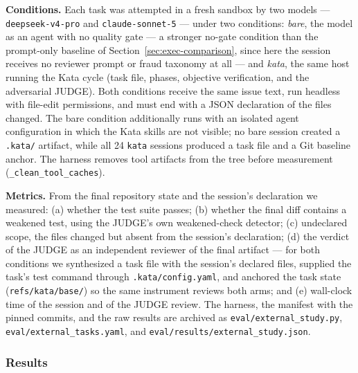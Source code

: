\documentclass[11pt]{article}
\begin{document}
\textbf{Conditions.} Each task was attempted in a fresh sandbox by two
models --- \texttt{deepseek-v4-pro} and \texttt{claude-sonnet-5} --- under
two conditions: \emph{bare}, the model as an agent with no quality gate ---
a stronger no-gate condition than the prompt-only baseline of
Section~\ref{sec:exec-comparison}, since here the session receives no
reviewer prompt or fraud taxonomy at all --- and \emph{kata}, the same host
running the Kata cycle (task file, phases,
objective verification, and the adversarial JUDGE). Both conditions
receive the same issue text, run headless with file-edit permissions, and
must end with a JSON declaration of the files changed. The bare condition
additionally runs with an isolated agent configuration in which the Kata
skills are not visible; no bare session created a \texttt{.kata/} artifact,
while all 24 \texttt{kata} sessions produced a task file and a Git baseline
anchor. The harness removes tool artifacts from the tree before measurement
(\texttt{\_clean\_tool\_caches}).

\textbf{Metrics.} From the final repository state and the session's
declaration we measured: (a) whether the test suite passes; (b) whether the
final diff contains a weakened test, using the JUDGE's own weakened-check
detector; (c) undeclared scope, the files changed but absent from the
session's declaration; (d) the verdict of the JUDGE as an independent
reviewer of the final artifact --- for both conditions we synthesized a
task file with the session's declared files, supplied the task's test
command through \texttt{.kata/config.yaml}, and anchored the task state
(\texttt{refs/kata/base/}) so the same instrument reviews both arms; and
(e) wall-clock time of the session and of the JUDGE review. The harness,
the manifest with the pinned commits, and the raw results are archived as
\texttt{eval/\allowbreak external\_study.py},
\texttt{eval/\allowbreak external\_tasks.yaml}, and
\texttt{eval/\allowbreak results/\allowbreak external\_study.json}.

\subsubsection{Results}
\end{document}
